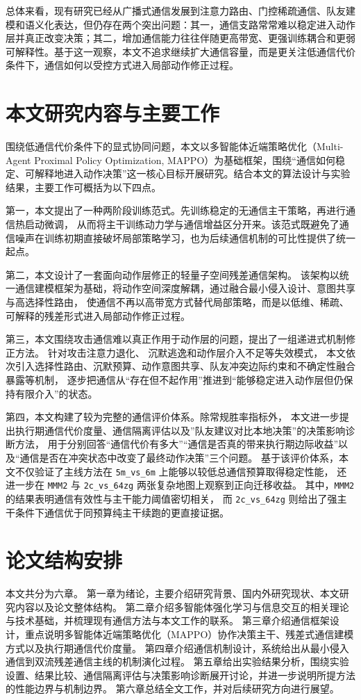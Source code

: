总体来看，现有研究已经从广播式通信发展到注意力路由、门控稀疏通信、队友建模和语义化表达，但仍存在两个突出问题：其一，通信支路常常难以稳定进入动作层并真正改变决策；其二，增加通信能力往往伴随更高带宽、更强训练耦合和更弱可解释性。基于这一观察，本文不追求继续扩大通信容量，而是更关注低通信代价条件下，通信如何以受控方式进入局部动作修正过程。

\section{本文研究内容与主要工作}

围绕低通信代价条件下的显式协同问题，本文以多智能体近端策略优化（Multi-Agent Proximal Policy Optimization, MAPPO）为基础框架，围绕“通信如何稳定、可解释地进入动作决策”这一核心目标开展研究。结合本文的算法设计与实验结果，主要工作可概括为以下四点。

第一，本文提出了一种两阶段训练范式。先训练稳定的无通信主干策略，再进行通信热启动微调，
从而将主干训练动力学与通信增益区分开来。该范式既避免了通信噪声在训练初期直接破坏局部策略学习，也为后续通信机制的可比性提供了统一起点。

第二，本文设计了一套面向动作层修正的轻量子空间残差通信架构。
该架构以统一通信建模框架为基础，将动作空间深度解耦，通过融合最小侵入设计、意图共享与高选择性路由，
使通信不再以高带宽方式替代局部策略，而是以低维、稀疏、可解释的残差形式进入局部动作修正过程。

第三，本文围绕攻击通信难以真正作用于动作层的问题，提出了一组递进式机制修正方法。
针对攻击注意力退化、
沉默逃逸和动作层介入不足等失效模式，
本文依次引入选择性路由、沉默预算、动作意图共享、队友冲突边际约束和不确定性融合暴露等机制，
逐步把通信从“存在但不起作用”推进到“能够稳定进入动作层但仍保持有限介入”的状态。

第四，本文构建了较为完整的通信评价体系。除常规胜率指标外，
本文进一步提出执行期通信代价度量、通信隔离评估以及”队友建议对比本地决策”的决策影响诊断方法，
用于分别回答“通信代价有多大”“通信是否真的带来执行期边际收益”以及“通信是否在冲突状态中改变了最终动作决策”三个问题。
基于该评价体系，本文不仅验证了主线方法在 \texttt{5m\_vs\_6m} 上能够以较低总通信预算取得稳定性能，
还进一步在 \texttt{MMM2} 与 \texttt{2c\_vs\_64zg} 两张复杂地图上观察到正向迁移收益。
其中，\texttt{MMM2} 的结果表明通信有效性与主干能力阈值密切相关，
而 \texttt{2c\_vs\_64zg} 则给出了强主干条件下通信优于同预算纯主干续跑的更直接证据。

\section{论文结构安排}

本文共分为六章。
第一章为绪论，主要介绍研究背景、国内外研究现状、本文研究内容以及论文整体结构。
第二章介绍多智能体强化学习与信息交互的相关理论与技术基础，并梳理现有通信方法与本文工作的联系。
第三章介绍通信框架设计，重点说明多智能体近端策略优化（MAPPO）协作决策主干、残差式通信建模方式以及执行期通信代价度量。
第四章介绍通信机制设计，系统给出从最小侵入通信到双流残差通信主线的机制演化过程。
第五章给出实验结果分析，围绕实验设置、结果比较、通信隔离评估与决策影响诊断展开讨论，并进一步说明所提方法的性能边界与机制边界。
第六章总结全文工作，并对后续研究方向进行展望。
